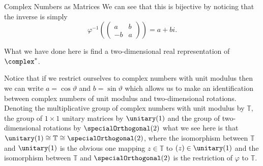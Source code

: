 \documentclass[fleqn]{NotesClass}
\newcommand*{\isomorphic}{\cong}
\begin{document}
\begin{exm}{Complex Numbers as Matrices}{}
        We can see that this is bijective by noticing that the inverse is simply
        \begin{equation}
            \varphi^{-1}\left( 
                \begin{pmatrix}
                    a & b\\
                    -b & a
                \end{pmatrix}
             \right) = a + bi.
        \end{equation}
        
        What we have done here is find a two-dimensional real representation of \(\complex^*\).
        
        Notice that if we restrict ourselves to complex numbers with unit modulus then we can write \(a = \cos\vartheta\) and \(b = \sin\vartheta\) which allows us to make an identification between complex numbers of unit modulus and two-dimensional rotations.
        Denoting the multiplicative group of complex numbers with unit modulus by \(\mathbb{T}\), the group of \(1\times 1\) unitary matrices by \(\unitary(1)\) and the group of two-dimensional rotations by \(\specialOrthogonal(2)\) what we see here is that \(\unitary(1) \isomorphic \mathbb{T} \isomorphic \specialOrthogonal(2)\), where the isomorphism between \(\mathbb{T}\) and \(\unitary(1)\) is the obvious one mapping \(z \in \mathbb{T}\) to \((z) \in \unitary(1)\) and the isomorphism between \(\mathbb{T}\) and \(\specialOrthogonal(2)\) is the restriction of \(\varphi\) to \(\mathbb{T}\).
    \end{exm}
    
\end{document}
